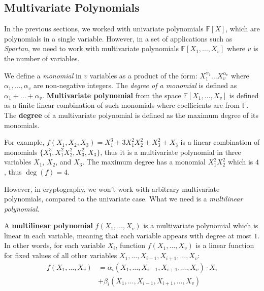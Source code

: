 \subsection{Multivariate Polynomials}

In the previous sections, we worked with univariate polynomials $\mathbb{F}[X]$,
which are polynomials in a single variable. However, in a set of applications
such as \textit{Spartan}, we need to work with multivariate polynomials
$\mathbb{F}[X_1,\dots,X_v]$ where $v$ is the number of variables.

\begin{definition}
    We define a \textit{monomial} in $v$ variables as a product of the form:
    $X_1^{\alpha_1}\dots X_v^{\alpha_v}$ where $\alpha_1,\dots,\alpha_v$ are
    non-negative integers. The \textit{degree of a monomial} is defined as
    $\alpha_1+\dots+\alpha_v$. \textbf{Multivariate polynomial} from the space
    $\mathbb{F}[X_1,\dots,X_v]$ is defined as a finite linear combination of
    such monomials where coefficients are from $\mathbb{F}$. The \textbf{degree}
    of a multivariate polynomial is defined as the maximum degree of its
    monomials.
\end{definition}

\begin{example}
    For example, $f(X_1,X_2,X_3)=X_1^3 + 3X_1^2X_2^2 + X_3^2 + X_3$ is a linear
    combination of monomials $\{X_1^3,X_1^2X_2^2,X_3^2,X_3\}$, thus it is a
    multivariate polynomial in three variables $X_1$, $X_2$, and $X_3$. The
    maximum degree has a monomial $X_1^2X_2^2$ which is $4$, thus $\deg(f) = 4$.
\end{example}

However, in cryptography, we won't work with arbitrary multivariate
polynomials, compared to the univariate case. What we need is a 
\textit{multilinear polynomial}.
\begin{definition}
    A \textbf{multilinear polynomial} $f(X_1,\dots,X_v)$ is a multivariate
    polynomial which is linear in each variable, meaning that each variable
    appears with degree at most $1$. In other words, for each variable
    $X_i$, function $f(X_1,\dots,X_v)$ is a linear function for fixed 
    values of all other variables $X_1,\dots,X_{i-1},X_{i+1},\dots,X_v$:
    \begin{align*}
        f(X_1,\dots,X_v) &= \alpha_i(X_1,\dots,X_{i-1},X_{i+1},\dots,X_v) \cdot X_i \\
        &+ \beta_i(X_1,\dots,X_{i-1},X_{i+1},\dots,X_v)
    \end{align*}
\end{definition}

